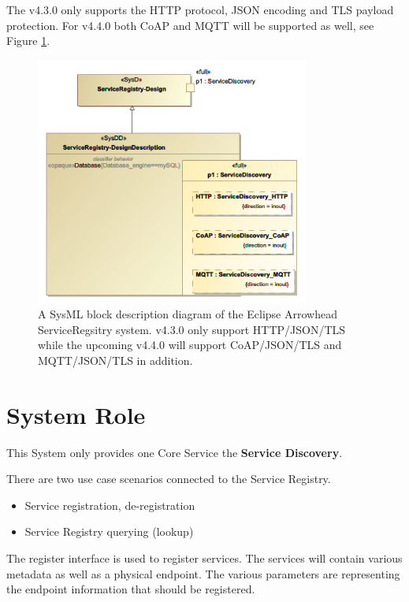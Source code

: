 \documentclass[a4paper]{arrowhead}
\begin{document}
The v4.3.0 only supports the HTTP protocol, JSON encoding and TLS
payload protection. For v4.4.0 both CoAP and MQTT will be supported as
well, see Figure \ref{fig:ServiceRegistry_SysDD}.
%
%
\begin{figure}[t!]
  \centering
  \label{fig:ServiceRegistry_SysDD}  
  \includegraphics[width=0.8\textwidth]{figures/ServiceRegistry_SysDD}
  \caption{A SysML block description diagram of the Eclipse Arrowhead
    ServiceRegsitry system. v4.3.0 only support HTTP/JSON/TLS while
    the upcoming v4.4.0 will support CoAP/JSON/TLS and MQTT/JSON/TLS
    in addition.}
\end{figure}
%


\section{System Role}
\label{sec:role}

This System only provides one Core Service the \textbf{Service
  Discovery}. 


There are two use case scenarios connected to the Service Registry.
\begin{itemize}
    \item Service registration, de-registration
    \item Service Registry querying (lookup)
\end{itemize}

The register interface is used to register services. The services will contain various metadata as well as a physical endpoint. The various parameters are representing the endpoint information that should be registered.
\end{document}

